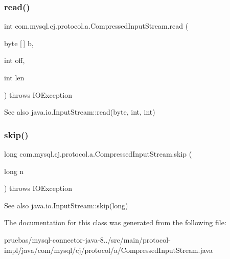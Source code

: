 \subsubsection{\texorpdfstring{read()}{read()}\hspace{0.1cm}{\footnotesize\ttfamily [3/3]}}
{\footnotesize\ttfamily int com.\+mysql.\+cj.\+protocol.\+a.\+Compressed\+Input\+Stream.\+read (\begin{DoxyParamCaption}\item[{byte \mbox{[}$\,$\mbox{]}}]{b,  }\item[{int}]{off,  }\item[{int}]{len }\end{DoxyParamCaption}) throws I\+O\+Exception}

\begin{DoxySeeAlso}{See also}
java.\+io.\+Input\+Stream\+::read(byte, int, int) 
\end{DoxySeeAlso}
\mbox{\label{classcom_1_1mysql_1_1cj_1_1protocol_1_1a_1_1_compressed_input_stream_af52c6a22e9a2c960a9bc5b7d5b9a95e7}} 
\subsubsection{\texorpdfstring{skip()}{skip()}}
{\footnotesize\ttfamily long com.\+mysql.\+cj.\+protocol.\+a.\+Compressed\+Input\+Stream.\+skip (\begin{DoxyParamCaption}\item[{long}]{n }\end{DoxyParamCaption}) throws I\+O\+Exception}

\begin{DoxySeeAlso}{See also}
java.\+io.\+Input\+Stream\+::skip(long) 
\end{DoxySeeAlso}


The documentation for this class was generated from the following file\+:\begin{DoxyCompactItemize}
\item 
pruebas/mysql-\/connector-\/java-\/8../src/main/protocol-\/impl/java/com/mysql/cj/protocol/a/Compressed\+Input\+Stream.\+java\end{DoxyCompactItemize}
